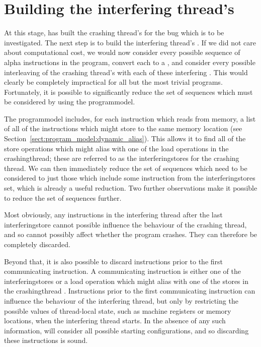 
\section{Building the interfering thread's \StateMachines}
\label{sect:derive:write_side}

At this stage, {\technique} has built the crashing thread's
{\StateMachine} for the bug which is to be investigated.  The next
step is to build the interfering thread's {\StateMachine}.  If we did
not care about computational cost, we would now consider every
possible sequence of \gls{alpha} instructions in the program,
convert each to a {\StateMachine}, and consider every possible
interleaving of the crashing thread's {\StateMachine} with each of
these interfering {\StateMachines}.  This would clearly be completely
impractical for all but the most trivial programs.  Fortunately, it is
possible to significantly reduce the set of sequences which must be
considered by using the \gls{programmodel}.

The \gls{programmodel} includes, for each instruction which reads from
memory, a list of all of the instructions which might store to the
same memory location (see
Section~\ref{sect:program_model:dynamic_alias}).  This allows it to
find all of the store operations which might alias with one of the
load operations in the \gls{crashingthread}; these are referred to as
the \glspl{interferingstore} for the crashing thread.  We can then
immediately reduce the set of sequences which need to be considered to
just those which include some instruction from the
\glspl{interferingstore} set, which is already a useful reduction.
Two further observations make it possible to reduce the set of
sequences further.

Most obviously, any instructions in the interfering thread after the
last \gls{interferingstore} cannot possible influence the behaviour of
the crashing thread, and so cannot possibly affect whether the program
crashes.  They can therefore be completely discarded.

Beyond that, it is also possible to discard instructions prior to the
first communicating instruction.  A communicating instruction is
either one of the \glspl{interferingstore} or a load operation which
might alias with one of the stores in the \gls{crashingthread}
{\StateMachine}.  Instructions prior to the first communicating
instruction can influence the behaviour of the interfering thread, but
only by restricting the possible values of thread-local state, such as
machine registers or memory locations, when the interfering thread
starts.  In the absence of any such information, {\technique} will
consider all possible starting configurations, and so discarding these
instructions is sound.

